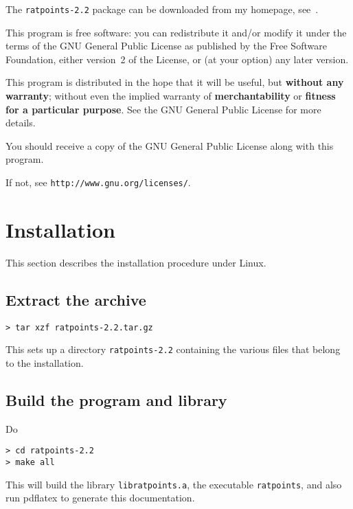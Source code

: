 \documentclass[12pt,a4paper,oneside]{amsart}
\newcommand{\rpversion}{2.2} %
\begin{document}
The \texttt{ratpoints-\rpversion} package can be downloaded from my homepage,
see~\cite{ratpoints}.

This program is free software: you can redistribute it and/or modify
it under the terms of the GNU General Public License as published
by the Free Software Foundation, either version~2 of the License, or
(at your option) any later version.

This program is distributed in the hope that it will be useful,
but \textbf{without any warranty}; without even the implied warranty of
\textbf{merchantability} or \textbf{fitness for a particular purpose}. See the
GNU General Public License for more details.

You should receive a copy of the GNU General Public License
along with this program.

If not, see \texttt{http://www.gnu.org/licenses/}.


\section{Installation}

This section describes the installation procedure under Linux.

\subsection{Extract the archive}

\begin{verbatim}
> tar xzf ratpoints-2.2.tar.gz
\end{verbatim}

This sets up a directory \texttt{ratpoints-\rpversion} containing the various
files that belong to the installation.

\subsection{Build the program and library}

Do

\begin{verbatim}
> cd ratpoints-2.2
> make all
\end{verbatim}

This will build the library \texttt{libratpoints.a}, the executable
\texttt{ratpoints}, and also run pdf\/latex to generate this documentation.
\end{document}
